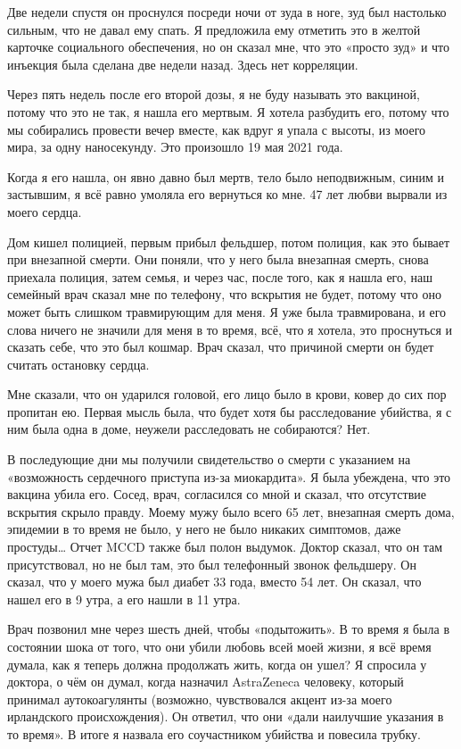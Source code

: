 Две недели спустя он проснулся посреди ночи от зуда в ноге, зуд был настолько
сильным, что не давал ему спать. Я предложила ему отметить это в желтой карточке
социального обеспечения, но он сказал мне, что это «просто зуд» и что инъекция
была сделана две недели назад. Здесь нет корреляции.

Через пять недель после его второй дозы, я не буду называть это вакциной, потому
что это не так, я нашла его мертвым. Я хотела разбудить его, потому что мы
собирались провести вечер вместе, как вдруг я упала с высоты, из моего мира, за
одну наносекунду. Это произошло 19 мая 2021 года.

Когда я его нашла, он явно давно был мертв, тело было неподвижным, синим и
застывшим, я всё равно умоляла его вернуться ко мне. 47 лет любви вырвали из
моего сердца.

Дом кишел полицией, первым прибыл фельдшер, потом полиция, как это бывает при
внезапной смерти. Они поняли, что у него была внезапная смерть, снова приехала
полиция, затем семья, и через час, после того, как я нашла его, наш семейный
врач сказал мне по телефону, что вскрытия не будет, потому что оно может быть
слишком травмирующим для меня. Я уже была травмирована, и его слова ничего не
значили для меня в то время, всё, что я хотела, это проснуться и сказать себе,
что это был кошмар. Врач сказал, что причиной смерти он будет считать остановку
сердца.

Мне сказали, что он ударился головой, его лицо было в крови, ковер до сих пор
пропитан ею. Первая мысль была, что будет хотя бы расследование убийства, я с
ним была одна в доме, неужели расследовать не собираются? Нет.

В последующие дни мы получили свидетельство о смерти с указанием на «возможность
сердечного приступа из-за миокардита». Я была убеждена, что это вакцина убила
его. Сосед, врач, согласился со мной и сказал, что отсутствие вскрытия скрыло
правду. Моему мужу было всего 65 лет, внезапная смерть дома, эпидемии в то время
не было, у него не было никаких симптомов, даже простуды… Отчет MCCD также был
полон выдумок. Доктор сказал, что он там присутствовал, но не был там, это был
телефонный звонок фельдшеру. Он сказал, что у моего мужа был диабет 33 года,
вместо 54 лет. Он сказал, что нашел его в 9 утра, а его нашли в 11 утра.

Врач позвонил мне через шесть дней, чтобы «подытожить». В то время я была в
состоянии шока от того, что они убили любовь всей моей жизни, я всё время
думала, как я теперь должна продолжать жить, когда он ушел? Я спросила у
доктора, о чём он думал, когда назначил AstraZeneca человеку, который принимал
аутокоагулянты (возможно, чувствовался акцент из-за моего ирландского
происхождения).  Он ответил, что они «дали наилучшие указания в то время». В
итоге я назвала его соучастником убийства и повесила трубку.

